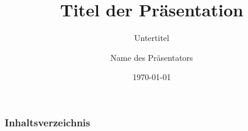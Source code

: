 \documentclass{beamer}
\title{Titel der Präsentation}
\subtitle{Untertitel}
\author{Name des Präsentators}
\institute{
    Hochschule Zittau/Görlitz\\
    Fakultät der Arbeit
}
\date{\today}
\begin{document}
    \maketitle
    \begin{frame}
        \frametitle{Inhaltsverzeichnis}
        \tableofcontents
    \end{frame}
    
    
\end{document}
